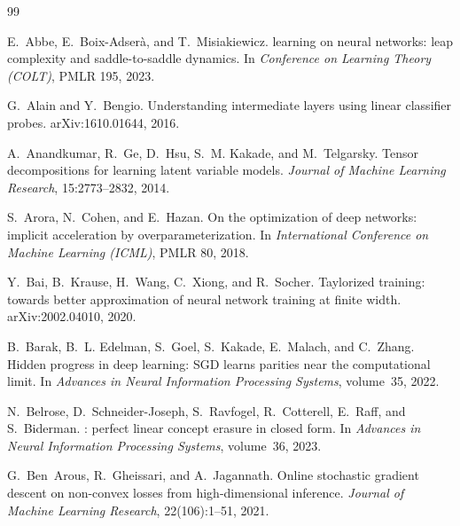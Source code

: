 \documentclass[11pt]{article}
\theoremstyle{definition}
\numberwithin{equation}{section}
\begin{document}
\begin{thebibliography}{99}
\small

E.~Abbe, E.~Boix-Adser\`a, and T.~Misiakiewicz.
 learning on neural networks: leap complexity and saddle-to-saddle dynamics.
\newblock In \emph{Conference on Learning Theory (COLT)}, PMLR 195, 2023.

G.~Alain and Y.~Bengio.
\newblock Understanding intermediate layers using linear classifier probes.
\newblock arXiv:1610.01644, 2016.

A.~Anandkumar, R.~Ge, D.~Hsu, S.~M. Kakade, and M.~Telgarsky.
\newblock Tensor decompositions for learning latent variable models.
\newblock \emph{Journal of Machine Learning Research}, 15:2773--2832, 2014.

S.~Arora, N.~Cohen, and E.~Hazan.
\newblock On the optimization of deep networks: implicit acceleration by overparameterization.
\newblock In \emph{International Conference on Machine Learning (ICML)}, PMLR 80, 2018.

Y.~Bai, B.~Krause, H.~Wang, C.~Xiong, and R.~Socher.
\newblock Taylorized training: towards better approximation of neural network training at finite width.
\newblock arXiv:2002.04010, 2020.

B.~Barak, B.~L. Edelman, S.~Goel, S.~Kakade, E.~Malach, and C.~Zhang.
\newblock Hidden progress in deep learning: {SGD} learns parities near the computational limit.
\newblock In \emph{Advances in Neural Information Processing Systems}, volume~35, 2022.

N.~Belrose, D.~Schneider-Joseph, S.~Ravfogel, R.~Cotterell, E.~Raff, and S.~Biderman.
: perfect linear concept erasure in closed form.
\newblock In \emph{Advances in Neural Information Processing Systems}, volume~36, 2023.

G.~Ben~Arous, R.~Gheissari, and A.~Jagannath.
\newblock Online stochastic gradient descent on non-convex losses from high-dimensional inference.
\newblock \emph{Journal of Machine Learning Research}, 22(106):1--51, 2021.


\end{thebibliography}
\end{document}
